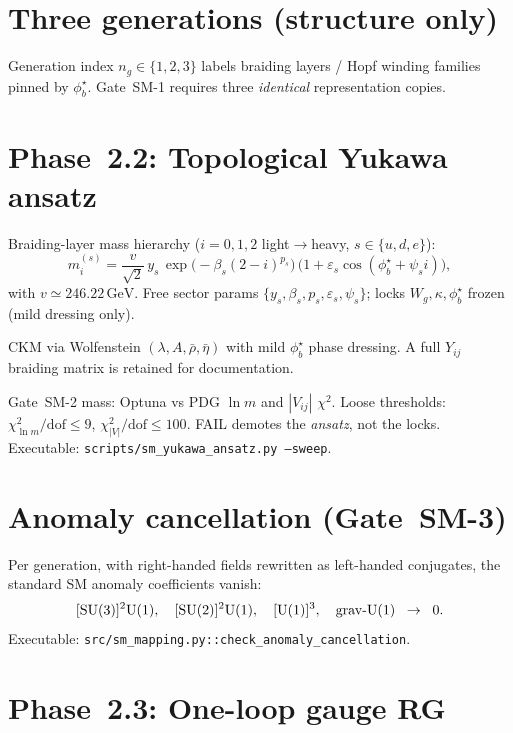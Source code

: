 \documentclass[11pt]{article}
\begin{document}
\section{Three generations (structure only)}

Generation index $n_g\in\{1,2,3\}$ labels braiding layers / Hopf winding families
pinned by $\phi_b^\star$. Gate~SM-1 requires three \emph{identical} representation
copies.

\section{Phase~2.2: Topological Yukawa ansatz}

Braiding-layer mass hierarchy ($i=0,1,2$ light$\to$heavy, $s\in\{u,d,e\}$):
\begin{equation}
m_i^{(s)}
=\frac{v}{\sqrt{2}}\, y_s\,
\exp\!\bigl(-\beta_s (2-i)^{p_s}\bigr)\,
\bigl(1+\varepsilon_s\cos(\phi_b^\star+\psi_s i)\bigr),
\label{eq:yukawa-mass}
\end{equation}
with $v\simeq 246.22\,\mathrm{GeV}$. Free sector params $\{y_s,\beta_s,p_s,\varepsilon_s,\psi_s\}$;
locks $W_g,\kappa,\phi_b^\star$ frozen (mild dressing only).

CKM via Wolfenstein $(\lambda,A,\bar\rho,\bar\eta)$ with mild $\phi_b^\star$ phase dressing.
A full $Y_{ij}$ braiding matrix is retained for documentation.

Gate~SM-2 mass: Optuna vs PDG $\ln m$ and $|V_{ij}|$ $\chi^2$.
Loose thresholds: $\chi^2_{\ln m}/\mathrm{dof}\le 9$,
$\chi^2_{|V|}/\mathrm{dof}\le 100$. FAIL demotes the \emph{ansatz}, not the locks.
Executable: \texttt{scripts/sm\_yukawa\_ansatz.py --sweep}.

\section{Anomaly cancellation (Gate~SM-3)}

Per generation, with right-handed fields rewritten as left-handed conjugates, the
standard SM anomaly coefficients vanish:
\[
[{\rm SU}(3)]^2{\rm U}(1),\quad
[{\rm SU}(2)]^2{\rm U}(1),\quad
[{\rm U}(1)]^3,\quad
{\rm grav}\mbox{-}{\rm U}(1)
\;\;\to\;\; 0.
\]
Executable: \texttt{src/sm\_mapping.py::check\_anomaly\_cancellation}.

\section{Phase~2.3: One-loop gauge RG}
\end{document}
